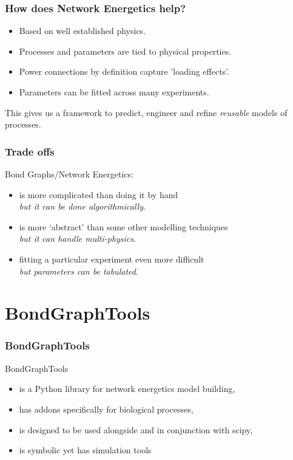 \documentclass[11pt,reqno]{beamer}
\begin{document}
\begin{frame}
\frametitle{How does Network Energetics help?}
\begin{itemize}
\item Based on well established physics.
\item Processes and parameters are tied to physical properties. 
\item Power connections by definition capture 'loading effects'.
\item Parameters can be fitted across many experiments.
\end{itemize}
\vfill

This gives us a framework to predict, engineer and refine \emph{reusable} models of processes.
\end{frame}

\begin{frame}
\frametitle{Trade offs}
Bond Graphs/Network Energetics:
\begin{itemize}
	\item<1-> is more complicated than doing it by hand\\
	\emph{but it can be done algorithmically}.
	\item<2-> is more `abstract' than some other modelling techniques\\
	\emph{but it can handle multi-physics}.
	\item<3-> fitting a particular experiment even more difficult\\
	\emph{but parameters can be tabulated}.
\end{itemize}
\end{frame}
\section{BondGraphTools}
\begin{frame}
\frametitle{BondGraphTools}
\vfill
BondGraphTools
\begin{itemize}
	\item is a Python library for network energetics model building,
	\item has addons specifically for biological processes,
	\item is designed to be used alongside and in conjunction with scipy,
	\item is symbolic yet has simulation tools
\end{itemize}
\end{frame}
\end{document}
